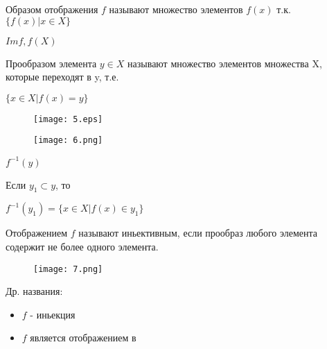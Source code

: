 \begin{definition}
    Образом отображения $f$ называют множество элементов $f(x)$ т.к. $\{f(x) | x \in X\}$

    \begin{notation}
        $Imf, f(X)$
    \end{notation}
\end{definition}



\begin{definition}
    Прообразом элемента $y \in X$ называют множество элементов множества X, которые переходят в y, т.е.

    $\{x \in X | f(x) = y\}$

    \begin{figure}[H]
        \centering
        \texttt{[image: 5.eps]}
        
        
        \label{fig:5}
    \end{figure}

    \begin{figure}[H]
        \centering
        \texttt{[image: 6.png]}
        
        
        \label{fig:6}
    \end{figure}

    \begin{notation}
        $f^{-1}(y)$


        Если $y_1 \subset y$, то 


        $f^{-1}(y_1) = \{x \in X | f(x) \in y_1\}$
    \end{notation}
\end{definition}

\begin{definition}
    Отображением $f$ называют иньективным, если прообраз любого элемента содержит не более одного элемента.

    \begin{figure}[H]
        \centering
        \texttt{[image: 7.png]}
        
        
        \label{fig:7}
    \end{figure}

    Др. названия:
    \begin{itemize}
        \item $f$ - иньекция
        \item $f$ является отображением в
    \end{itemize}
\end{definition}

